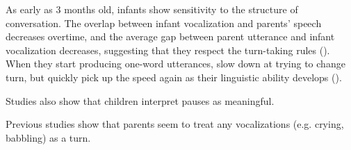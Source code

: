 As early as 3 months old, infants show sensitivity to the structure of conversation. The overlap between infant vocalization and parents' speech decreases overtime, and the average gap between parent utterance and infant vocalization decreases, suggesting that they respect the turn-taking rules (\cite{hilbrink2013turn3mo}). When they start producing one-word utterances, slow down at trying to change turn, but quickly pick up the speed again as their linguistic ability develops (\cite{hilbrink2013turn}). 


Studies also show that children interpret pauses as meaningful.

Previous studies show that parents seem to treat any vocalizations (e.g. crying, babbling) as a turn. 


